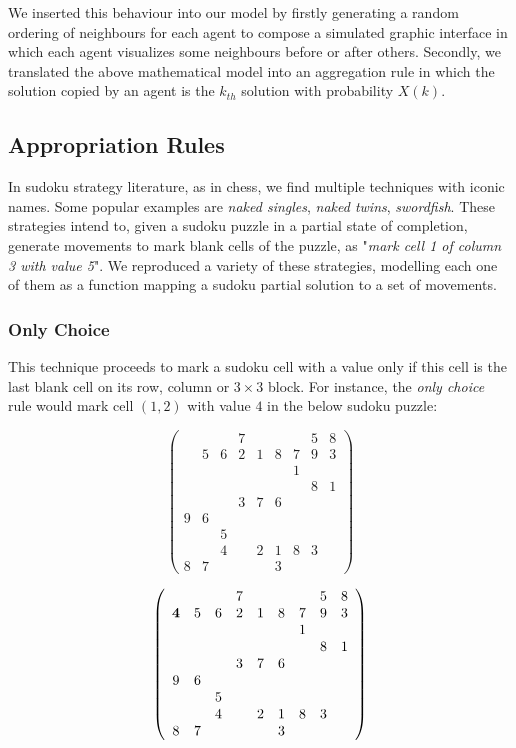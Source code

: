 \documentclass{article}
\begin{document}
We inserted this behaviour into our model by firstly generating a random ordering of neighbours for each agent to compose a simulated graphic interface in which each agent visualizes some neighbours before or after others. Secondly, we translated the above mathematical model into an aggregation rule in which the solution copied by an agent is the $k_{th}$ solution with probability $X(k)$.

\subsection{Appropriation Rules}

In sudoku strategy literature, as in chess, we find multiple techniques with iconic names. Some popular examples are {\em naked singles}, {\em naked twins}, {\em swordfish}. These strategies intend to, given a sudoku puzzle in a partial state of completion, generate movements to mark blank cells of the puzzle, as "{\em mark cell 1 of column 3 with value 5}". We reproduced a variety of these strategies, modelling each one of them as a function mapping a sudoku partial solution to a set of movements.

\subsubsection{Only Choice}

This technique proceeds to mark a sudoku cell with a value only if this cell is the last blank cell on its row, column or $3 \times 3$ block. For instance, the {\em only choice} rule would mark cell $(1,2)$ with value $4$ in the below sudoku puzzle:

\[ \left( \begin{array}{ccccccccc}
  &   &   & 7 &   &   &   & 5 & 8 \\
  & 5 & 6 & 2 & 1 & 8 & 7 & 9 & 3 \\
  &   &   &   &   &   & 1 &   &   \\
  &   &   &   &   &   &   & 8 & 1 \\
  &   &   & 3 & 7 & 6 &   &   &   \\
9 & 6 &   &   &   &   &   &   &   \\
  &   & 5 &   &   &   &   &   &   \\
  &   & 4 &   & 2 & 1 & 8 & 3 &   \\
8 & 7 &   &   &   & 3 &   &   &   \end{array}  \right)\]

\[ \left( \begin{array}{ccccccccc}
  &   &   & 7 &   &   &   & 5 & 8 \\
{\bf 4} & 5 & 6 & 2 & 1 & 8 & 7 & 9 & 3 \\
  &   &   &   &   &   & 1 &   &   \\
  &   &   &   &   &   &   & 8 & 1 \\
  &   &   & 3 & 7 & 6 &   &   &   \\
9 & 6 &   &   &   &   &   &   &   \\
  &   & 5 &   &   &   &   &   &   \\
  &   & 4 &   & 2 & 1 & 8 & 3 &   \\
8 & 7 &   &   &   & 3 &   &   &   \end{array}  \right)\]
\end{document}
